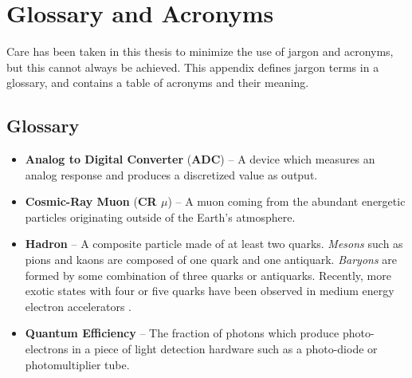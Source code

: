 \chapter{Glossary and Acronyms}
\label{app_glossary}
Care has been taken in this thesis to minimize the use of jargon and
acronyms, but this cannot always be achieved.  This appendix defines
jargon terms in a glossary, and contains a table of acronyms and their
meaning.

\section{Glossary}
\label{jargonapp}
\begin{itemize}

\item \textbf{Analog to Digital Converter} (\textbf{ADC}) -- A device which measures an analog response and produces a discretized value as output.

\item \textbf{Cosmic-Ray Muon} (\textbf{CR $\mu$}) -- A muon coming from
the abundant energetic particles originating outside of the Earth's
atmosphere.

\item \textbf{Hadron} -- A composite particle made of at least two quarks.  \textit{Mesons} such as pions and kaons are composed of one quark and one antiquark.  \textit{Baryons} are formed by some combination of three quarks or antiquarks.  Recently, more exotic states with four or five quarks have been observed in medium energy electron accelerators \cite{dias2013z_,barth2003evidence}.

\item \textbf{Quantum Efficiency} -- The fraction of photons which produce photo-electrons in a piece of light detection hardware such as a photo-diode or photomultiplier tube.
\end{itemize}

